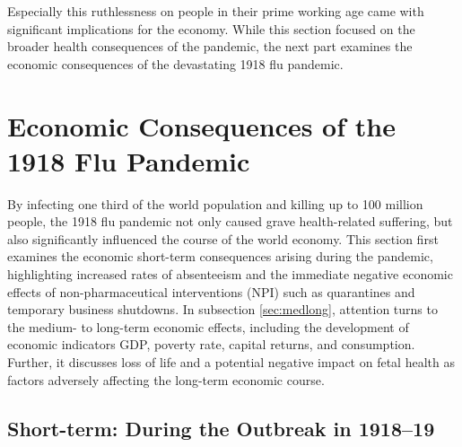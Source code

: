 \documentclass[12pt,a4paper]{article}
\begin{document}
Especially this ruthlessness on people in their prime working age came with significant implications for the economy.
While this section focused on the broader health consequences of the pandemic, the next part examines the economic consequences of the devastating 1918 flu pandemic.

\section{Economic Consequences of the 1918 Flu Pandemic}

By infecting one third of the world population and killing up to 100 million people, the 1918 flu pandemic not only caused grave health-related suffering, but also significantly influenced the course of the world economy.
This section first examines the economic short-term consequences arising during the pandemic, highlighting increased rates of absenteeism and the immediate negative economic effects of non-pharmaceutical interventions (NPI) such as quarantines and temporary business shutdowns.
In subsection \ref{sec:medlong}, attention turns to the medium- to long-term economic effects, including the development of economic indicators GDP, poverty rate, capital returns, and consumption. 
Further, it discusses loss of life and a potential negative impact on fetal health as factors adversely affecting the long-term economic course.


	\subsection{Short-term: During the Outbreak in 1918--19} \label{subsec:short}
\end{document}
